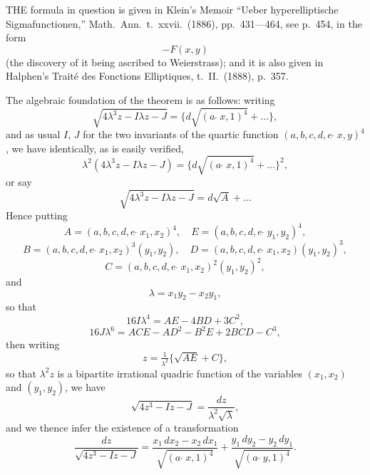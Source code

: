 \documentclass[11pt,a4paper]{article}
\begin{document}
THE formula in question is given in Klein's Memoir ``Ueber hyperelliptische Sigmafunctionen,'' Math.\ Ann.\ t.\ xxvii.\ (1886), pp.\ 431---464, see p.\ 454, in the form
\[
-F(x, y)
\]
(the discovery of it being ascribed to Weierstrass); and it is also given in Halphen's Trait\'e des Fonctions Elliptiques, t.\ II.\ (1888), p.\ 357.

The algebraic foundation of the theorem is as follows: writing
\[
\sqrt{4\lambda^3z - I\lambda z - J} = \{d\sqrt{(a\,\check{\,}\,x, 1)^4} + \ldots\},
\]
and as usual $I$, $J$ for the two invariants of the quartic function $(a, b, c, d, e \,\check{\,}\, x, y)^4$, we have identically, as is easily verified,
\[
\lambda^2(4\lambda^3z - I\lambda z - J) = \{d\sqrt{(a\,\check{\,}\,x, 1)^4} + \ldots\}^2,
\]
or say
\[
\sqrt{4\lambda^3z - I\lambda z - J} = d\sqrt{A} + \ldots
\]
Hence putting
\[
A = (a, b, c, d, e \,\check{\,}\, x_1, x_2)^4,\quad E = (a, b, c, d, e \,\check{\,}\, y_1, y_2)^4,
\]
\[
B = (a, b, c, d, e \,\check{\,}\, x_1, x_2)^3(y_1, y_2),\quad D = (a, b, c, d, e \,\check{\,}\, x_1, x_2)(y_1, y_2)^3,
\]
\[
C = (a, b, c, d, e \,\check{\,}\, x_1, x_2)^2(y_1, y_2)^2,
\]
and
\[
\lambda = x_1y_2 - x_2y_1,
\]
so that
\[
16I\lambda^4 = AE - 4BD + 3C^2,
\]
\[
16J\lambda^6 = ACE - AD^2 - B^2E + 2BCD - C^3,
\]
then writing
\[
z = \tfrac{1}{\lambda^2}\{\sqrt{AE} + C\},
\]
so that $\lambda^2z$ is a bipartite irrational quadric function of the variables $(x_1, x_2)$ and $(y_1, y_2)$, we have
\[
\sqrt{4z^3 - Iz - J} = \frac{dz}{\lambda^2\sqrt{\lambda}},
\]
and we thence infer the existence of a transformation
\[
\frac{dz}{\sqrt{4z^3 - Iz - J}} = \frac{x_1\,dx_2 - x_2\,dx_1}{\sqrt{(a\,\check{\,}\,x, 1)^4}} + \frac{y_1\,dy_2 - y_2\,dy_1}{\sqrt{(a\,\check{\,}\,y, 1)^4}}.
\]
\end{document}
